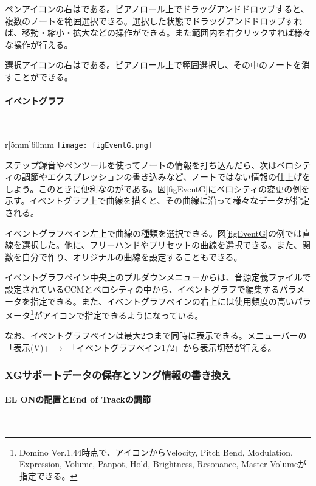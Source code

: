 \documentclass[uplatex, 10pt, dvipdfmx]{jsarticle}
\numberwithin{equation}{section}
\newcommand{\emphj}[1]{\textbf{\textrm{\textgt{{#1}}}}}
\begin{document}
ペンアイコンの右は\emphj{選択ツール}である。ピアノロール上でドラッグアンドドロップすると、複数のノートを範囲選択できる。選択した状態でドラッグアンドドロップすれば、移動・縮小・拡大などの操作ができる。また範囲内を右クリックすれば様々な操作が行える。

選択アイコンの右は\emphj{消しゴムツール}である。ピアノロール上で範囲選択し、その中のノートを消すことができる。

\paragraph{イベントグラフ} \ 

\begin{wrapfigure}{r}[5mm]{60mm}
  \centering
  \texttt{[image: figEventG.png]}
  \caption{イベントグラフの使い方。ベロシティを編集するモードで直線を描くと、配置されているノートのベロシティが描いた直線に沿って指定される。}
  \label{figEventG}
\end{wrapfigure}
ステップ録音やペンツールを使ってノートの情報を打ち込んだら、次はベロシティの調節やエクスプレッションの書き込みなど、ノートではない情報の仕上げをしよう。このときに便利なのが\emphj{イベントグラフ}である。図\ref{figEventG}にベロシティの変更の例を示す。イベントグラフ上で曲線を描くと、その曲線に沿って様々なデータが指定される。

イベントグラフペイン左上で曲線の種類を選択できる。図\ref{figEventG}の例では直線を選択した。他に、フリーハンドやプリセットの曲線を選択できる。また、関数を自分で作り、オリジナルの曲線を設定することもできる。

イベントグラフペイン中央上のプルダウンメニューからは、音源定義ファイルで設定されているCCMとベロシティの中から、イベントグラフで編集するパラメータを指定できる。また、イベントグラフペインの右上には使用頻度の高いパラメータ\footnote{Domino Ver.1.44時点で、アイコンからVelocity, Pitch Bend, Modulation, Expression, Volume, Panpot, Hold, Brightness, Resonance, Master Volumeが指定できる。}がアイコンで指定できるようになっている。

なお、イベントグラフペインは最大2つまで同時に表示できる。メニューバーの「表示(V)」$\rightarrow$ 「イベントグラフペイン1/2」から表示切替が行える。

\subsubsection{XGサポートデータの保存とソング情報の書き換え}
\paragraph{EL ONの配置とEnd of Trackの調節}\
\end{document}
